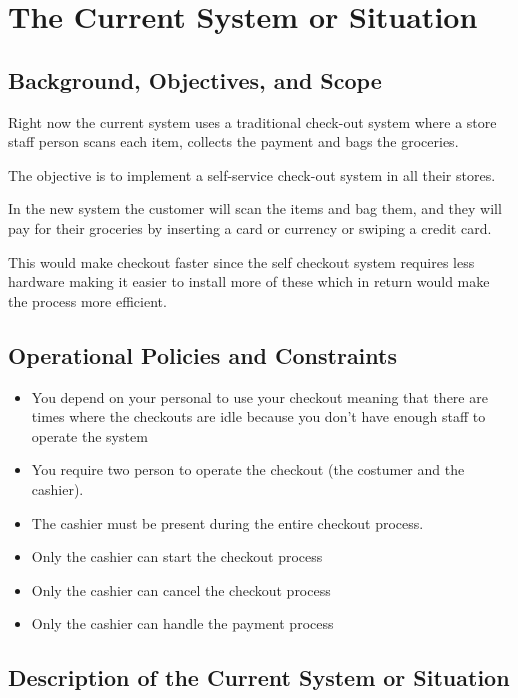 \section{The Current System or Situation}

\subsection{Background, Objectives, and Scope}
Right now the current system uses a traditional check-out system where a store 
	staff person scans each item, collects the payment 
	and bags the groceries. \newline

	\noindent The objective is to implement a self-service check-out system in all 
	their stores.\newline

	\noindent In the new system the customer will scan the items and bag them, 
	and they will pay for their groceries by inserting a card or currency 
	or swiping a credit card. \newline

	\noindent This would make checkout faster since the self checkout system 
	requires less hardware making it easier to install more of these which in 
	return would make the process more efficient.
\subsection{Operational Policies and Constraints}
\begin{itemize}
	\item You depend on your personal to use your checkout meaning that 
	there are times where the checkouts are idle because you don't have 
	enough staff to operate the system
	\item You require two person to operate the checkout (the costumer 
	and the cashier).
	\item The cashier must be present during the entire checkout process.
	\item Only the cashier can start the checkout process
	\item Only the cashier can cancel the checkout process
	\item Only the cashier can handle the payment process
\end{itemize}

\pagebreak

\subsection{Description of the Current System or Situation}

